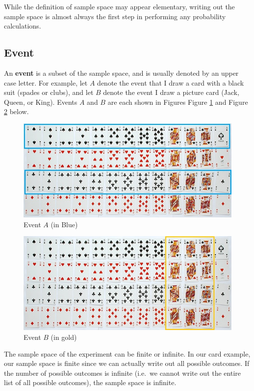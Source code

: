 \documentclass[
]{book}
\begin{document}
While the definition of sample space may appear elementary, writing out the sample space is almost always the first step in performing any probability calculations.

\subsection{Event}\label{event}

An \textbf{event} is a subset of the sample space, and is usually denoted by an upper case letter. For example, let \(A\) denote the event that I draw a card with a black suit (spades or clubs), and let \(B\) denote the event I draw a picture card (Jack, Queen, or King). Events \(A\) and \(B\) are each shown in Figures Figure \ref{fig:cardsA} and Figure \ref{fig:cardsB} below.

\begin{figure}
\centering
\includegraphics{images/02-cardsA.jpg}
\caption{\label{fig:cardsA}Event \(A\) (in Blue)}
\end{figure}

\begin{figure}
\centering
\includegraphics{images/02-cardsB.jpg}
\caption{\label{fig:cardsB}Event \(B\) (in gold)}
\end{figure}

The sample space of the experiment can be finite or infinite. In our card example, our sample space is finite since we can actually write out all possible outcomes. If the number of possible outcomes is infinite (i.e.~we cannot write out the entire list of all possible outcomes), the sample space is infinite.
\end{document}
